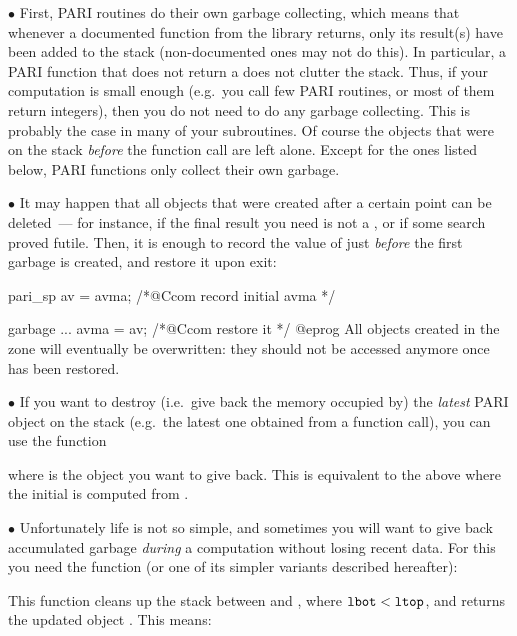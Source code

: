 \noindent$\bullet$
First, PARI routines do their own garbage collecting, which means that
whenever a documented function from the library returns, only its result(s)
have been added to the stack (non-documented ones may not do this). In
particular, a PARI function that does not return a  does not clutter
the stack. Thus, if your computation is small enough (e.g.~you call few PARI
routines, or most of them return  integers), then you do not need
to do any garbage collecting. This is probably the case in many of your
subroutines. Of course the objects that were on the stack \emph{before} the
function call are left alone. Except for the ones listed below, PARI
functions only collect their own garbage.

\noindent$\bullet$
It may happen that all objects that were created after a certain point can
be deleted~--- for instance, if the final result you need is not a
, or if some search proved futile. Then, it is enough to record
the value of  just \emph{before} the first garbage is created,
and restore it upon exit:

\bprog
pari_sp av = avma; /*@Ccom record initial avma */

garbage ...
avma = av; /*@Ccom restore it */
@eprog
\noindent All objects created in the  zone will eventually
be overwritten: they should not be accessed anymore once  has been
restored.

\noindent$\bullet$
If you want to destroy (i.e.~give back the memory occupied by) the
\emph{latest} PARI object on the stack (e.g.~the latest one obtained from a
function call), you can use the function%


\noindent where  is the object you want to give back. This is
equivalent to the above where the initial  is computed from .

\noindent$\bullet$
Unfortunately life is not so simple, and sometimes you will want
to give back accumulated garbage \emph{during} a computation without losing
recent data. For this you need the  function (or one of its
simpler variants described hereafter):


\noindent
This function cleans up the stack between  and , where
${\tt lbot} < {\tt ltop}$, and returns the updated object . This means:

